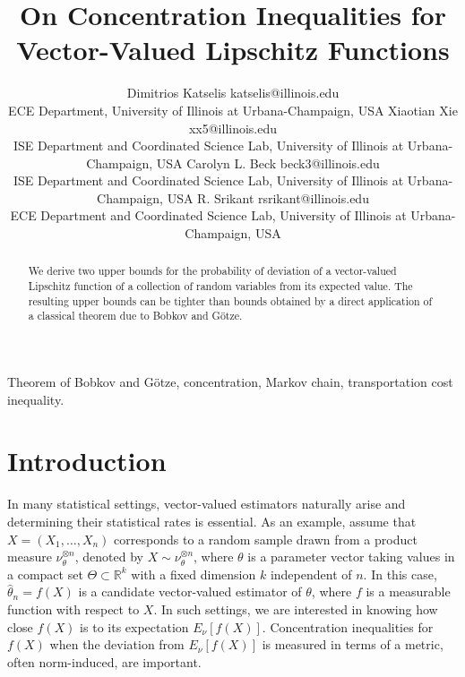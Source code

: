 \documentclass[twoside,11pt]{article}
\begin{document}
\title{On Concentration Inequalities for Vector-Valued Lipschitz Functions}

\author{\name Dimitrios Katselis \email katselis@illinois.edu \\
       \addr ECE Department, University of Illinois at Urbana-Champaign, USA
       \AND
       \name Xiaotian Xie \email xx5@illinois.edu \\
       \addr ISE Department and Coordinated Science Lab, University of Illinois at Urbana-Champaign, USA
       \AND
       \name Carolyn L. Beck \email beck3@illinois.edu \\
       \addr ISE Department and Coordinated Science Lab, University of Illinois at Urbana-Champaign, USA
       \AND
       \name R. Srikant \email rsrikant@illinois.edu \\
       \addr ECE Department and Coordinated Science Lab, University of Illinois at Urbana-Champaign, USA
       }




\maketitle

\begin{abstract}%
We derive two upper bounds for the probability of deviation of a vector-valued Lipschitz function of a collection of random variables from its expected value.  The resulting upper bounds can be tighter than bounds obtained by a direct application of a classical theorem due to Bobkov and G\"{o}tze. 
\end{abstract}

\begin{keywords}
  Theorem of Bobkov and G\"{o}tze, concentration, Markov chain,  transportation cost inequality.
\end{keywords}

\section{Introduction}

In many statistical settings, vector-valued estimators naturally arise and determining their statistical rates is essential. As an example, assume that $X=(X_1,\ldots, X_n)$ corresponds to a random sample drawn from a product measure $\nu_{\theta}^{\otimes n}$, denoted by $X\sim \nu_{\theta}^{\otimes n}$, where $\theta$ is a parameter vector taking values in a compact set $\Theta \subset \mathbb{R}^k$ with a fixed dimension $k$ independent of $n$. In this case, $\hat{\theta}_n=f(X)$ is a candidate vector-valued estimator of $\theta$, where $f$ is a measurable function with respect to $X$.  In such settings, we are interested in knowing how close $f(X)$ is to its expectation $E_{\nu}[f(X)]$. Concentration inequalities for $f(X)$ when the deviation from  $E_{\nu}[f(X)]$ is measured in terms of a metric, often norm-induced, are important. 
\end{document}
